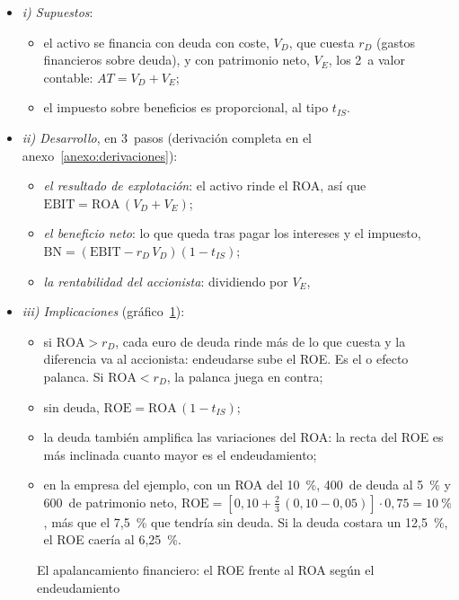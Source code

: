 \documentclass[11pt]{article}
\begin{document}
\begin{itemize}
\item \emph{i) Supuestos}:
  \begin{itemize}
  \item el activo se financia con deuda con coste, $V_D$, que cuesta $r_D$ (gastos financieros sobre deuda), y con patrimonio neto, $V_E$, los 2~a valor contable: $AT=V_D+V_E$;
  \item el impuesto sobre beneficios es proporcional, al tipo $t_{IS}$.
  \end{itemize}
\item \emph{ii) Desarrollo}, en 3~pasos (derivación completa en el anexo~\ref{anexo:derivaciones}):
  \begin{itemize}
  \item \emph{el resultado de explotación}: el activo rinde el ROA, así que $\mathrm{EBIT}=\mathrm{ROA}\,(V_D+V_E)$;
  \item \emph{el beneficio neto}: lo que queda tras pagar los intereses y el impuesto, $\mathrm{BN}=(\mathrm{EBIT}-r_D\,V_D)(1-t_{IS})$;
  \item \emph{la rentabilidad del accionista}: dividiendo por $V_E$,
  \end{itemize}
\item \emph{iii) Implicaciones} (gráfico~\ref{fig:apalancamiento-financiero}):
  \begin{itemize}
  \item si $\mathrm{ROA}>r_D$, cada euro de deuda rinde más de lo que cuesta y la diferencia va al accionista: endeudarse sube el ROE. Es el  o efecto palanca. Si $\mathrm{ROA}<r_D$, la palanca juega en contra;
  \item sin deuda, $\mathrm{ROE}=\mathrm{ROA}\,(1-t_{IS})$;
  \item la deuda también amplifica las variaciones del ROA: la recta del ROE es más inclinada cuanto mayor es el endeudamiento;
  \item en la empresa del ejemplo, con un ROA del 10~\%, 400~de deuda al 5~\% y 600~de patrimonio neto, $\mathrm{ROE}=[0{,}10+\tfrac{2}{3}\,(0{,}10-0{,}05)]\cdot0{,}75=10~\%$, más que el 7,5~\% que tendría sin deuda. Si la deuda costara un 12,5~\%, el ROE caería al 6,25~\%.
  \end{itemize}
\end{itemize}

\begin{figure}[H]
\centering
\caption{El apalancamiento financiero: el ROE frente al ROA según el endeudamiento}\label{fig:apalancamiento-financiero}
\end{figure}
\end{document}
